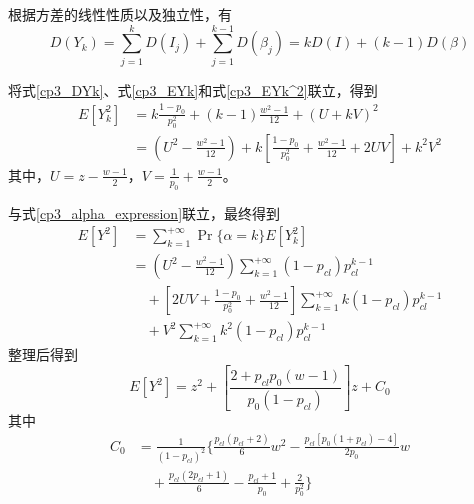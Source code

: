     根据方差的线性性质以及独立性，有
    \begin{equation}\label{cp3_DYk}
        D(Y_k) = \sum_{j=1}^{k} D(I_j) + \sum_{j=1}^{k-1} D(\beta_j) = k D(I) + (k-1) D(\beta)
    \end{equation}

    将式\eqref{cp3_DYk}、式\eqref{cp3_EYk}和式\eqref{cp3_EYk^2}联立，得到
    \begin{equation}\label{cp3_EYK^2_withAB}
        \begin{aligned}
            E[Y_k^2] &= k \frac{1-p_0}{p_0^2} + (k-1)\frac{w^2-1}{12} + (U + kV)^2 \\
            &= \left( U^2 - \frac{w^2-1}{12} \right) + k \left[ \frac{1-p_0}{p_0^2} + \frac{w^2-1}{12} + 2UV \right] + k^2 V^2
        \end{aligned}
    \end{equation}
    其中，$U=z-\frac{w-1}{2}$，$V=\frac{1}{p_0}+\frac{w-1}{2}$。

    与式\eqref{cp3_alpha_expression}联立，最终得到
    \begin{equation}\label{cp3_EY2}
        \begin{aligned}
            E[Y^2] &= \sum_{k=1}^{+\infty} \Pr\{\alpha=k\} E[Y_k^2] \\
            &= \left( U^2 - \frac{w^2-1}{12} \right) \sum_{k=1}^{+\infty}(1-p_{cl})p_{cl}^{k-1} \\
            &\quad + \left[ 2UV + \frac{1-p_0}{p_0^2} + \frac{w^2-1}{12} \right] \sum_{k=1}^{+\infty} k(1-p_{cl})p_{cl}^{k-1} \\
            &\quad + V^2 \sum_{k=1}^{+\infty} k^2(1-p_{cl})p_{cl}^{k-1}
        \end{aligned}
    \end{equation}
    整理后得到
    \begin{equation}\label{cp3_EY2result}
        E[Y^2] = z^2 + \left[ \frac{2 + p_{cl} p_0 (w-1)}{p_0 (1-p_{cl})} \right] z + C_0
    \end{equation}
    其中
    \begin{equation}\label{cp3_C0}
        \begin{split}
            C_0 &= \frac{1}{(1-p_{cl})^2} \Bigg\{ \frac{p_{cl}(p_{cl}+2)}{6} w^2 - \frac{p_{cl} [ p_0(1+p_{cl}) - 4 ]}{2 p_0} w \\
                &\quad + \frac{p_{cl}(2p_{cl}+1)}{6} - \frac{p_{cl}+1}{p_0} + \frac{2}{p_0^2} \Bigg\}
        \end{split}
    \end{equation}


